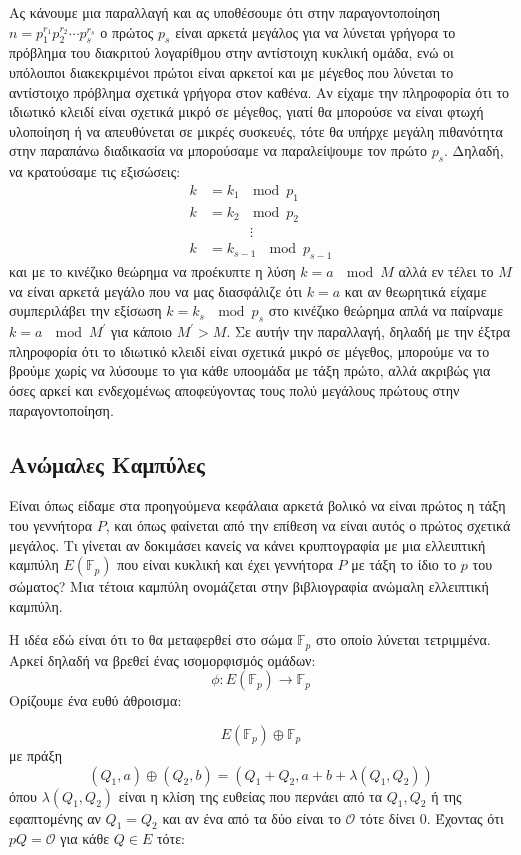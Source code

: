 \documentclass[oneside,a4paper]{article}
\begin{document}
Ας κάνουμε μια παραλλαγή και ας υποθέσουμε ότι στην παραγοντοποίηση $n = p_1^{r_1} p_2^{r_2} \cdots p_s^{r_s}$ ο πρώτος $p_s$ είναι αρκετά μεγάλος για να λύνεται γρήγορα το πρόβλημα του διακριτού λογαρίθμου στην αντίστοιχη κυκλική ομάδα, ενώ οι υπόλοιποι διακεκριμένοι πρώτοι είναι αρκετοί και με μέγεθος που λύνεται το αντίστοιχο πρόβλημα σχετικά γρήγορα στον καθένα. Αν είχαμε την πληροφορία ότι το ιδιωτικό κλειδί είναι σχετικά μικρό σε μέγεθος, γιατί θα μπορούσε να είναι φτωχή υλοποίηση ή να απευθύνεται σε μικρές συσκευές, τότε θα υπήρχε μεγάλη πιθανότητα στην παραπάνω διαδικασία να μπορούσαμε να παραλείψουμε τον πρώτο $p_s$. Δηλαδή, να κρατούσαμε τις εξισώσεις:
\begin{align*}
	k &= k_1 \ \mod p_1 \\
	k &= k_2 \ \mod p_2 \\
	& \quad \quad \quad \vdots \\
	k &= k_{s-1} \ \mod p_{s-1}
\end{align*}
και με το κινέζικο θεώρημα να προέκυπτε η λύση $k=a \ \mod M$ αλλά εν τέλει το $M$ να είναι αρκετά μεγάλο που να μας διασφάλιζε ότι $k=a$ και αν θεωρητικά είχαμε συμπεριλάβει την εξίσωση $k=k_s \ \mod p_s$ στο κινέζικο θεώρημα απλά να παίρναμε $k = a \ \mod M^{\prime}$ για κάποιο $M^{\prime}>M$. Σε αυτήν την παραλλαγή, δηλαδή με την έξτρα πληροφορία ότι το ιδιωτικό κλειδί είναι σχετικά μικρό σε μέγεθος, μπορούμε να το βρούμε χωρίς να λύσουμε το  για κάθε υποομάδα με τάξη πρώτο, αλλά ακριβώς για όσες αρκεί και ενδεχομένως αποφεύγοντας τους πολύ μεγάλους πρώτους στην παραγοντοποίηση. 
\subsection{Ανώμαλες Καμπύλες}
Είναι όπως είδαμε στα προηγούμενα κεφάλαια αρκετά βολικό να είναι πρώτος η τάξη του γεννήτορα $P$, και όπως φαίνεται από την επίθεση  να είναι αυτός ο πρώτος σχετικά μεγάλος. Τι γίνεται αν δοκιμάσει κανείς να κάνει κρυπτογραφία με μια ελλειπτική καμπύλη $E(\mathbb{F}_p)$ που είναι κυκλική και έχει γεννήτορα $P$ με τάξη το ίδιο το $p$ του σώματος? Μια τέτοια καμπύλη ονομάζεται στην βιβλιογραφία ανώμαλη ελλειπτική καμπύλη.


Η ιδέα εδώ είναι ότι το  θα μεταφερθεί στο σώμα $\mathbb{F}_p$ στο οποίο λύνεται τετριμμένα. Αρκεί δηλαδή να βρεθεί ένας ισομορφισμός ομάδων:
$$\phi : E(\mathbb{F}_p) \longrightarrow \mathbb{F}_p$$
Ορίζουμε ένα ευθύ άθροισμα:

$$E(\mathbb{F}_p) \oplus \mathbb{F}_p$$ με πράξη
$$(Q_1,a) \oplus (Q_2,b) = (Q_1+Q_2, a+b+\lambda (Q_1,Q_2))$$ όπου $\lambda(Q_1,Q_2)$ είναι η κλίση της ευθείας που περνάει από τα $Q_1, Q_2$ ή της εφαπτομένης αν $Q_1 = Q_2$ και αν ένα από τα δύο είναι το $\mathcal{O}$ τότε δίνει $0$. Έχοντας ότι $p Q = \mathcal{O}$ για κάθε $Q \in E$ τότε:
\end{document}
